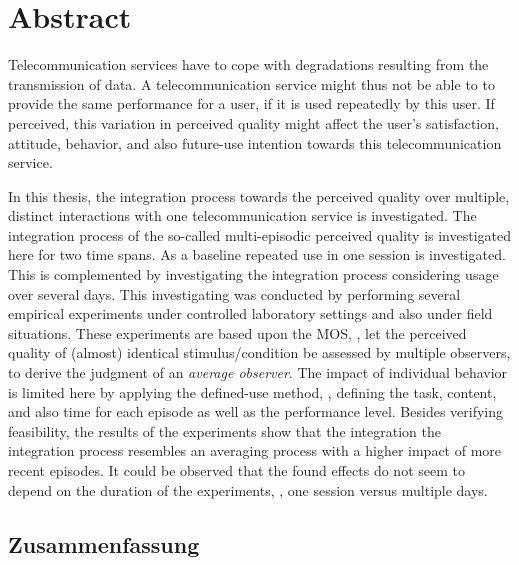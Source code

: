 \begingroup
\let\clearpage\relax
\let\cleardoublepage\relax
\let\cleardoublepage\relax

\chapter*{Abstract}
Telecommunication services have to cope with degradations resulting from the transmission of data.
A telecommunication service might thus not be able to to provide the same performance for a user, if it is used repeatedly by this user.
If perceived, this variation in perceived quality might affect the user's satisfaction, attitude, behavior, and also future-use intention towards this telecommunication service.

In this thesis, the integration process towards the perceived quality over multiple, distinct interactions with one telecommunication service is investigated.
The integration process of the so-called multi-episodic perceived quality is investigated here for two time spans.
As a baseline repeated use in one session is investigated. %
This is complemented by investigating the integration process considering usage over several days.
This investigating was conducted by performing several empirical experiments under controlled laboratory settings and also under field situations.
These experiments are based upon the \acs{MOS}, \ie, let the perceived quality of (almost) identical stimulus/condition be assessed by multiple observers, to derive the judgment of an \emph{average observer}.
The impact of individual behavior is limited here by applying the defined-use method, \ie, defining the task, content, and also time for each episode as well as the performance level.
Besides verifying feasibility, the results of the experiments show that the integration the integration process resembles an averaging process with a higher impact of more recent episodes.
It could be observed that the found effects do not seem to depend on the duration of the experiments, \ie, one session versus multiple days.

\vfill

\begin{otherlanguage}{ngerman}
\chapter*{Zusammenfassung}


\end{otherlanguage}
\endgroup			
\vfill